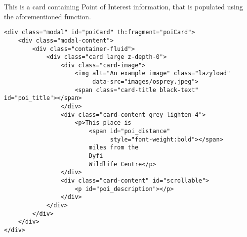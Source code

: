 This is a card containing Point of Interest information, that is populated using the aforementioned function.

\begin{verbatim}
<div class="modal" id="poiCard" th:fragment="poiCard">
    <div class="modal-content">
        <div class="container-fluid">
            <div class="card large z-depth-0">
                <div class="card-image">
                    <img alt="An example image" class="lazyload"
                         data-src="images/osprey.jpeg">
                    <span class="card-title black-text" id="poi_title"></span>
                </div>
                <div class="card-content grey lighten-4">
                    <p>This place is
                        <span id="poi_distance"
                              style="font-weight:bold"></span>
                        miles from the
                        Dyfi
                        Wildlife Centre</p>
                </div>
                <div class="card-content" id="scrollable">
                    <p id="poi_description"></p>
                </div>
            </div>
        </div>
    </div>
</div>
\end{verbatim}